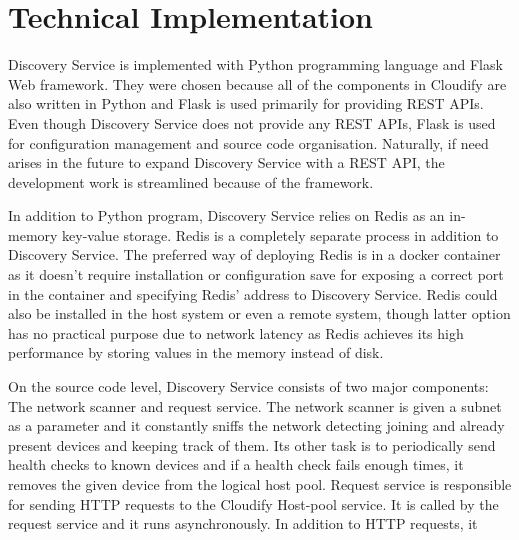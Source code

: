 \section{Technical Implementation}

Discovery Service is implemented with Python programming language and Flask Web framework. They were chosen because all of the components in Cloudify are also written in Python and Flask is used primarily for providing REST APIs. Even though Discovery Service does not provide any REST APIs, Flask is used for configuration management and source code organisation. Naturally, if need arises in the future to expand Discovery Service with a REST API, the development work is streamlined because of the framework.

In addition to Python program, Discovery Service relies on Redis \cite{Redis} as an in-memory key-value storage. Redis is a completely separate process in addition to Discovery Service. The preferred way of deploying Redis is in a docker container as it doesn't require installation or configuration save for exposing a correct port in the container and specifying Redis' address to Discovery Service. Redis could also be installed in the host system or even a remote system, though latter option has no practical purpose due to network latency as Redis achieves its high performance by storing values in the memory instead of disk.

On the source code level, Discovery Service consists of two major components: The network scanner and request service. The network scanner is given a subnet as a parameter and it constantly sniffs the network detecting joining and already present devices and keeping track of them. Its other task is to periodically send health checks to known devices and if a health check fails enough times, it removes the given device from the logical host pool. Request service is responsible for sending HTTP requests to the Cloudify Host-pool service. It is called by the request service and it runs asynchronously. In addition to HTTP requests, it 